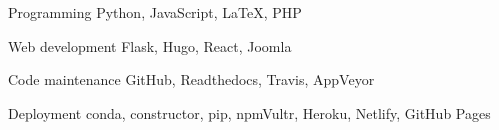 \begin{minipage}[t]{0.5\textwidth}
\begin{cvskills}

  \cvskill
    {Programming} %
    {Python, JavaScript, LaTeX, PHP} %

  \cvskill
    {Web development} %
    {Flask, Hugo, React, Joomla} %

  \cvskill
    {Code maintenance} %
    {GitHub, Readthedocs, Travis, AppVeyor} %

  \cvskill
    {Deployment} %
    {conda, constructor, pip, npm\newline Vultr, Heroku, Netlify, GitHub Pages} %

\end{cvskills}
\end{minipage}
\begin{minipage}[t]{0.5\textwidth}


\begin{cvskills}



\end{cvskills}
\end{minipage}
